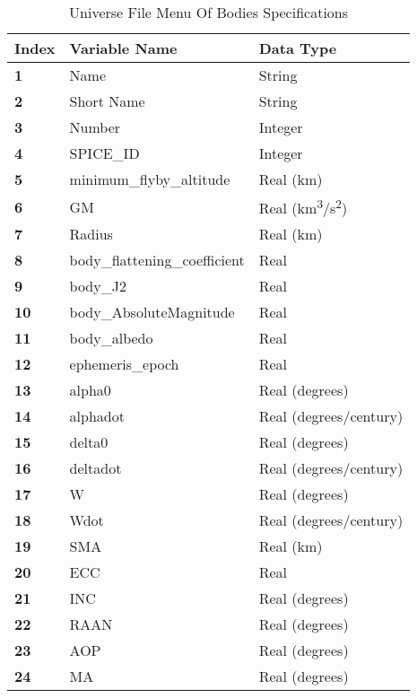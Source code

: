 \begin{table}[H]
    \centering
    \begin{tabular}{lll}
    \hline
    \textbf{Index} & \textbf{Variable Name} & \textbf{Data Type} \\
    \hline
    \textbf{1} & Name & String \\
    \textbf{2} & Short Name & String \\
    \textbf{3} & Number & Integer \\
    \textbf{4} & \ac{SPICE}\_ID & Integer \\
    \textbf{5} & minimum\_flyby\_altitude & Real (km) \\
    \textbf{6} & GM & Real (km\textsuperscript{3}/s\textsuperscript{2}) \\
    \textbf{7} & Radius & Real (km) \\
    \textbf{8} & body\_flattening\_coefficient  & Real \\
    \textbf{9} & body\_J2 & Real \\
    \textbf{10} & body\_AbsoluteMagnitude & Real \\
    \textbf{11} & body\_albedo & Real \\
    \textbf{12} & ephemeris\_epoch & Real \\
    \textbf{13} & alpha0 & Real (degrees) \\
    \textbf{14} & alphadot & Real (degrees/century) \\
    \textbf{15} & delta0 & Real (degrees) \\
    \textbf{16} & deltadot & Real (degrees/century) \\
    \textbf{17} & W & Real (degrees) \\
    \textbf{18} & Wdot & Real (degrees/century) \\
    \textbf{19} & \acs{SMA} & Real (km) \\
    \textbf{20} & \acs{ECC} & Real \\
    \textbf{21} & \acs{INC} & Real (degrees) \\
    \textbf{22} & \acs{RAAN} & Real (degrees) \\
    \textbf{23} & \acs{AOP} & Real (degrees) \\
    \textbf{24} & \acs{MA} & Real (degrees) \\
    \end{tabular}
    \caption{Universe File Menu Of Bodies Specifications}
    \label{tab:universe_menuofbodiesinfo}
\end{table}


